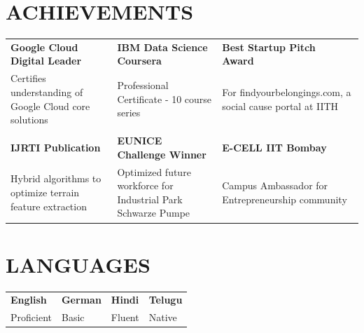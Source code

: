 \documentclass[a4paper,11pt]{article}
\newcommand{\safehref}[2]{#2}
\let\href\safehref
\newcommand{\extlink}{\raisebox{0.2ex}{\scriptsize\faExternalLink*}}
\begin{document}
\section*{ACHIEVEMENTS}
{\small
\setlength{\tabcolsep}{8pt}
\renewcommand{\arraystretch}{1.15}
\begin{tabularx}{\textwidth}{@{}>{\RaggedRight\arraybackslash}X >{\RaggedRight\arraybackslash}X >{\RaggedRight\arraybackslash}X@{}}
  \textbf{\href{https://example.com}{Google Cloud Digital Leader\ \extlink}} &
  \textbf{\href{https://example.com}{IBM Data Science Coursera\ \extlink}} &
  \textbf{\href{https://example.com}{Best Startup Pitch Award\ \extlink}} \\
  Certifies understanding of Google Cloud core solutions &
  Professional Certificate - 10 course series &
  For findyourbelongings.com, a social cause portal at IITH \\
  \\[-2pt]
  \textbf{\href{https://example.com}{IJRTI Publication\ \extlink}} &
  \textbf{\href{https://example.com}{EUNICE Challenge Winner\ \extlink}} &
  \textbf{\href{https://example.com}{E-CELL IIT Bombay\ \extlink}} \\
  Hybrid algorithms to optimize terrain feature extraction &
  Optimized future workforce for Industrial Park Schwarze Pumpe &
  Campus Ambassador for Entrepreneurship community \\
\end{tabularx}
}

\section*{LANGUAGES}
\begin{tabularx}{\textwidth}{@{}XXXX@{}}
  \textbf{English} & \textbf{German} & \textbf{Hindi} & \textbf{Telugu} \\
  Proficient & Basic & Fluent & Native \\
\end{tabularx}

\vfill
\end{document}
